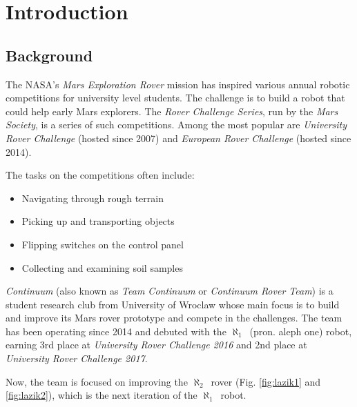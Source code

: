 \documentclass[english,inz,shortabstract]{iithesis}
\author         {Błażej Sowa}
\newcommand{\oldrovername}{$\aleph_1$\ }
\newcommand{\rovername}{$\aleph_2$\ }
\begin{document}
\chapter{Introduction}

\section{Background}
The NASA's \textit{Mars Exploration Rover} mission has inspired various annual robotic competitions for university level students. The challenge is to build a robot that could help early Mars explorers. 
The \textit{Rover Challenge Series}, run by the \textit{Mars Society}, is a series of such competitions. Among the most popular are \textit{University Rover Challenge} (hosted since 2007) and \textit{European Rover Challenge} (hosted since 2014).

The tasks on the competitions often include:
\begin{itemize}[itemsep=0pt, parsep=2pt, topsep=0pt]
	\item Navigating through rough terrain
	\item Picking up and transporting objects
	\item Flipping switches on the control panel 
	\item Collecting and examining soil samples
\end{itemize}

\textit{Continuum} (also known as \textit{Team Continuum} or \textit{Continuum Rover Team}) is a student research club from University of Wroclaw whose main focus is to build and improve its Mars rover prototype and compete in the challenges. The team has been operating since 2014 and debuted with the \oldrovername (pron. aleph one) robot, earning 3rd place at \textit{University Rover Challenge 2016} and 2nd place at \textit{University Rover Challenge 2017}.

Now, the team is focused on improving the \rovername rover (Fig. \ref{fig:lazik1} and \ref{fig:lazik2}), which is the next iteration of the \oldrovername robot. 
\end{document}
